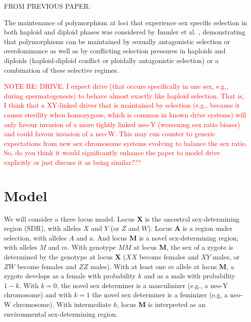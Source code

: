 \documentclass[12pt]{article}
\begin{document}
{\color{blue} 
\noindent FROM PREVIOUS PAPER:

The maintenance of polymorphism at loci that experience sex specific selection in both haploid and diploid phases was considered by Immler et al. \cite{Immler:2012tl}, demonstrating that polymorphisms can be maintained by sexually antagonistic selection or overdominance as well as by conflicting selection pressures in haploids and diploids (haploid-diploid conflict or ploidally antagonistic selection) or a combination of these selective regimes.  

}

\textcolor{red}{NOTE RE: DRIVE. I expect drive (that occurs specifically in one sex, e.g., during spermatogenesis) to behave almost exactly like haploid selection. That is, I think that a XY-linked driver that is maintained by selection (e.g., because it causes sterility when homozygous, which is common in known drive systems) will only favour invasion of a more tightly linked neo-Y (worsening sex ratio biases) and could favour invasion of a neo-W. This may run counter to generic expectations from new sex chromosome systems evolving to balance the sex ratio. So, do you think it would significantly enhance the paper to model drive explicitly or just discuss it as being similar???}

\section*{Model}

We will consider a three locus model.
Locus \textbf{X} is the ancestral sex-determining region (SDR), with alleles $X$ and $Y$ (or $Z$ and $W$).
Locus \textbf{A} is a region under selection, with alleles $A$ and $a$.
And locus \textbf{M} is a novel sex-determining region, with alleles $M$ and $m$.
With genotype $MM$ at locus \textbf{M}, the sex of a zygote is determined by the genotype at locus \textbf{X} ($XX$ become females and $XY$ males, or $ZW$ become females and $ZZ$ males).
With at least one $m$ allele at locus \textbf{M}, a zygote develops as a female with probability $k$ and as a male with probability $1-k$.
With $k=0$, the novel sex determiner is a masculinizer (e.g., a neo-Y chromosome) and with $k=1$ the novel sex determiner is a feminizer (e.g, a neo-W chromosome).
With intermediate $k$, locus \textbf{M} is interpreted as an environmental sex-determining region.
\end{document}
